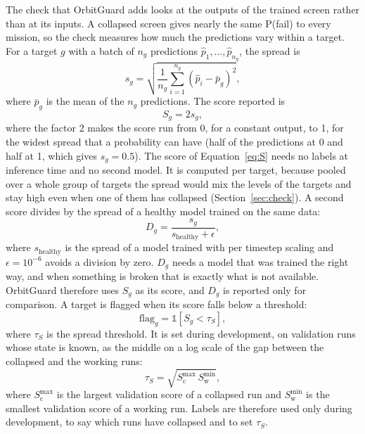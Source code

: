 The check that OrbitGuard adds looks at the outputs of the trained screen rather than at its inputs. A collapsed screen gives nearly the same P(fail) to every mission, so the check measures how much the predictions vary within a target. For a target $g$ with a batch of $n_g$ predictions $\hat{p}_1, \ldots, \hat{p}_{n_g}$, the spread is
\begin{equation}
s_g = \sqrt{ \frac{1}{n_g} \sum_{i=1}^{n_g}{ \left( \hat{p}_i - \bar{p}_g \right)^2 } },
\label{eq:spread}
\end{equation}
where $\bar{p}_g$ is the mean of the $n_g$ predictions. The score reported is
\begin{equation}
S_g = 2 s_g,
\label{eq:S}
\end{equation}
where the factor 2 makes the score run from 0, for a constant output, to 1, for the widest spread that a probability can have (half of the predictions at 0 and half at 1, which gives $s_g = 0.5$). The score of Equation~\ref{eq:S} needs no labels at inference time and no second model. It is computed per target, because pooled over a whole group of targets the spread would mix the levels of the targets and stay high even when one of them has collapsed (Section~\ref{sec:check}). A second score divides by the spread of a healthy model trained on the same data:
\begin{equation}
D_g = \frac{s_g}{s_{\mathrm{healthy}} + \epsilon},
\label{eq:D}
\end{equation}
where $s_{\mathrm{healthy}}$ is the spread of a model trained with per timestep scaling and $\epsilon = 10^{-6}$ avoids a division by zero. $D_g$ needs a model that was trained the right way, and when something is broken that is exactly what is not available. OrbitGuard therefore uses $S_g$ as its score, and $D_g$ is reported only for comparison. A target is flagged when its score falls below a threshold:
\begin{equation}
\mathrm{flag}_g = \mathbb{1} \left[ S_g < \tau_S \right],
\label{eq:flag}
\end{equation}
where $\tau_S$ is the spread threshold. It is set during development, on validation runs whose state is known, as the middle on a log scale of the gap between the collapsed and the working runs:
\begin{equation}
\tau_S = \sqrt{ S_{\mathrm{c}}^{\max} \, S_{\mathrm{w}}^{\min} },
\label{eq:tau}
\end{equation}
where $S_{\mathrm{c}}^{\max}$ is the largest validation score of a collapsed run and $S_{\mathrm{w}}^{\min}$ is the smallest validation score of a working run. Labels are therefore used only during development, to say which runs have collapsed and to set $\tau_S$.

